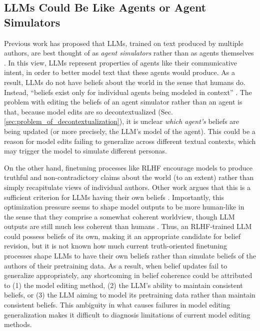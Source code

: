 \documentclass[11pt,a4paper]{article}
\begin{document}
\subsection{LLMs Could Be Like Agents or Agent Simulators}
\label{sec:llms_could_be_like_agents_or_agent_simulators}

Previous work has proposed that LLMs, trained on text produced by multiple authors, are best thought of as \emph{agent simulators} rather than as agents themselves \citep{andreas2022language, joshi2024personas}. In this view, LLMs represent properties of agents like their communicative intent, in order to better model text that these agents would produce. As a result, LLMs do not have beliefs about the world in the sense that humans do. Instead, ``beliefs exist only for individual agents being modeled in context'' \citep{andreas2022language}. The problem with editing the beliefs of an agent simulator rather than an agent is that, because model edits are so decontextualized (Sec. \ref{sec:problem_of_decontextualization}), it is unclear \emph{which agent's} beliefs are being updated (or more precisely, the LLM's model of the agent). This could be a reason for model edits failing to generalize across different textual contexts, which may trigger the model to simulate different personas.

On the other hand, finetuning processes like RLHF \citep{ouyang2022training} encourage models to produce truthful and non-contradictory claims about the world (to an extent) rather than simply recapitulate views of individual authors. Other work argues that this is a sufficient criterion for LLMs having their own beliefs \citep{hofweber2024language}. Importantly, this optimization pressure seems to shape model outputs to be more human-like in the sense that they comprise a somewhat coherent worldview, though LLM outputs are still much less coherent than humans \citep{chen2023models, powell2024taxi}. Thus, an RLHF-trained LLM could possess beliefs of its own, making it an appropriate candidate for belief revision, but it is not known how much current truth-oriented finetuning processes shape LLMs to have their own beliefs rather than simulate beliefs of the authors of their pretraining data. As a result, when belief updates fail to generalize appropriately, any shortcoming in belief coherence could be attributed to (1) the model editing method, (2) the LLM's ability to maintain consistent beliefs, or (3) the LLM aiming to model its pretraining data rather than maintain consistent beliefs. This ambiguity in what causes failures in model editing generalization makes it difficult to diagnosis limitations of current model editing methods. 
\end{document}
